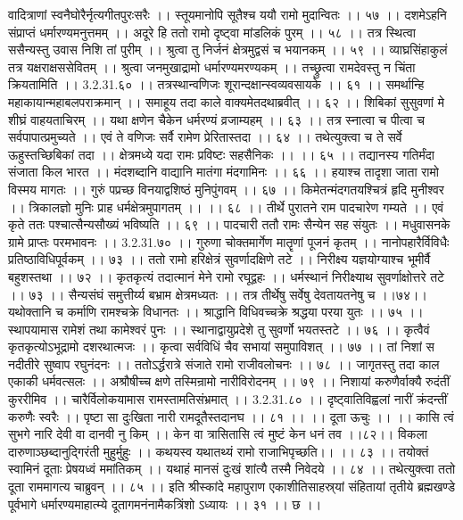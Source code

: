 वादित्राणां स्वनैघोरैर्नृत्यगीतपुरःसरैः ।।
स्तूयमानोपि सूतैश्च ययौ रामो मुदान्वितः ।। ५७ ।।
दशमेऽहनि संप्राप्तं धर्मारण्यमनुत्तमम् ।।
अदूरे हि ततो रामो दृष्ट्वा मांडलिकं पुरम् ।। ५८ ।।
तत्र स्थित्वा ससैन्यस्तु उवास निशि तां पुरीम् ।।
श्रुत्वा तु निर्जनं क्षेत्रमुद्वसं च भयानकम् ।। ५९ ।।
व्याघ्रसिंहाकुलं तत्र यक्षराक्षससेवितम् ।।
श्रुत्वा जनमुखाद्रामो धर्मारण्यमरण्यकम् ।।
तच्छ्रुत्वा रामदेवस्तु न चिंता क्रियतामिति ।। 3.2.31.६० ।।
तत्रस्थान्वणिजः शूरान्दक्षान्स्वव्यवसायके ।। ६१ ।।
समर्थान्हि महाकायान्महाबलपराक्रमान् ।।
समाहूय तदा काले वाक्यमेतदथाब्रवीत् ।। ६२ ।।
शिबिकां सुसुवणां मे शीघ्रं वाहयताचिरम् ।।
यथा क्षणेन चैकेन धर्मरण्यं व्रजाम्यहम् ।। ६३ ।।
तत्र स्नात्वा च पीत्वा च सर्वपापात्प्रमुच्यते ।।
एवं ते वणिजः सर्वै रामेण प्रेरितास्तदा ।। ६४ ।।
तथेत्युक्त्वा च ते सर्वे ऊहुस्तच्छिबिकां तदा ।।
क्षेत्रमध्ये यदा रामः प्रविष्टः सहसैनिकः ।। ।। ६५ ।।
तद्यानस्य गतिर्मंदा संजाता किल भारत ।।
मंदशब्दानि वाद्यानि मातंगा मंदगामिनः ।। ६६ ।।
हयाश्च तादृशा जाता रामो विस्मय मागतः ।।
गुरुं पप्रच्छ विनयाद्वशिष्ठं मुनिपुंगवम् ।। ६७ ।।
किमेतन्मंदगतयश्चित्रं हृदि मुनीश्वर ।।
त्रिकालज्ञो मुनिः प्राह धर्मक्षेत्रमुपागतम् ।। ।। ६८ ।।
तीर्थे पुरातने राम पादचारेण गम्यते ।।
एवं कृते ततः पश्चात्सैन्यसौख्यं भविष्यति ।। ६९ ।।
पादचारी ततौ रामः सैन्येन सह संयुतः ।।
मधुवासनके ग्रामे प्राप्तः परमभावनः ।। 3.2.31.७० ।।
गुरुणा चोक्तमार्गेण मातॄणां पूजनं कृतम् ।।
नानोपहारैर्विविधैः प्रतिष्ठाविधिपूर्वकम् ।। ७३ ।।
ततो रामो हरिक्षेत्रं सुवर्णादक्षिणे तटे ।।
निरीक्ष्य यज्ञयोग्याश्च भूमीर्वै बहुशस्तथा ।। ७२ ।।
कृतकृत्यं तदात्मानं मेने रामो रघूद्वहः ।।
धर्मस्थानं निरीक्ष्याथ सुवर्णाक्षोत्तरे तटे ।। ७३ ।।
सैन्यसंघं समुत्तीर्य्य बभ्राम क्षेत्रमध्यतः ।।
तत्र तीर्थेषु सर्वेषु देवतायतनेषु च ।।७४।।
यथोक्तानि च कर्माणि रामश्चक्रे विधानतः ।।
श्राद्धानि विधिवच्चक्रे श्रद्धया परया युतः ।। ७५ ।।
स्थापयामास रामेशं तथा कामेश्वरं पुनः ।।
स्थानाद्वायुप्रदेशे तु सुवर्णो भयतस्तटे ।। ७६ ।।
कृत्वैवं कृतकृत्योऽभूद्रामो दशरथात्मजः ।।
कृत्वा सर्वविधिं चैव सभायां समुपाविशत् ।। ७७ ।।
तां निशां स नदीतीरे सुष्वाप रघुनंदनः ।।
ततोऽर्द्धरात्रे संजाते रामो राजीवलोचनः ।। ७८ ।।
जागृतस्तु तदा काल एकाकी धर्मवत्सलः ।।
अश्रौषीच्च क्षणे तस्मिन्रामो नारीविरोदनम् ।। ७९ ।।
निशायां करुणैर्वाक्यै रुदंतीं कुररीमिव ।।
चारैर्विलोकयामास रामस्तामतिसंभ्रमात् ।। 3.2.31.८० ।।
दृष्ट्वातिविह्वलां नारीं क्रंदन्तीं करुणैः स्वरैः ।।
पृष्टा सा दुःखिता नारी रामदूतैस्तदानघ ।। ८१ ।।
।। दूता ऊचुः ।। ।।
कासि त्वं सुभगे नारि देवी वा दानवी नु किम् ।।
केन वा त्रासितासि त्वं मुष्टं केन धनं तव ।।८२।।
विकला दारुणाञ्छब्दानुद्गिरंती मुहुर्मुहुः ।।
कथयस्व यथातथ्यं रामो राजाभिपृच्छति।। ।। ८३ ।।
तयोक्तं स्वामिनं दूताः प्रेषयध्वं ममांतिकम् ।।
यथाहं मानसं दुःखं शांत्यै तस्मै निवेदये ।। ८४ ।।
तथेत्युक्त्वा ततो दूता राममागत्य चाब्रुवन् ।। ८५ ।।
इति श्रीस्कांदे महापुराण एकाशीतिसाहस्र्यां संहितायां तृतीये ब्रह्मखण्डे पूर्वभागे धर्मारण्यमाहात्म्ये दूतागमनंनामैकत्रिंशो ऽध्यायः ।। ३१ ।। छ ।।

